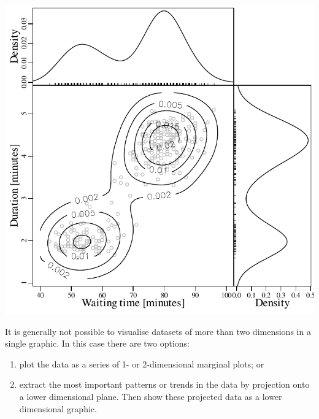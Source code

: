\noindent\begin{minipage}[t][][b]{.5\textwidth}
  \includegraphics[width=\textwidth]{../figures/KDE2D.pdf}\medskip
\end{minipage}
\begin{minipage}[t][][t]{.5\textwidth}
  \label{fig:KDE2D}
\end{minipage}

It is generally not possible to visualise datasets of more than two
dimensions in a single graphic. In this case there are two options:

\begin{enumerate}
  \item plot the data as a series of 1- or 2-dimensional marginal
    plots; or
  \item extract the most important patterns or trends in the data by
    projection onto a lower dimensional plane. Then show these
    projected data as a lower dimensional graphic.
\end{enumerate}

